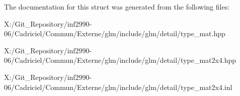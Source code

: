 The documentation for this struct was generated from the following files\-:\begin{DoxyCompactItemize}
\item 
X\-:/\-Git\-\_\-\-Repository/inf2990-\/06/\-Cadriciel/\-Commun/\-Externe/glm/include/glm/detail/type\-\_\-mat.\-hpp\item 
X\-:/\-Git\-\_\-\-Repository/inf2990-\/06/\-Cadriciel/\-Commun/\-Externe/glm/include/glm/detail/type\-\_\-mat2x4.\-hpp\item 
X\-:/\-Git\-\_\-\-Repository/inf2990-\/06/\-Cadriciel/\-Commun/\-Externe/glm/include/glm/detail/type\-\_\-mat2x4.\-inl\end{DoxyCompactItemize}
